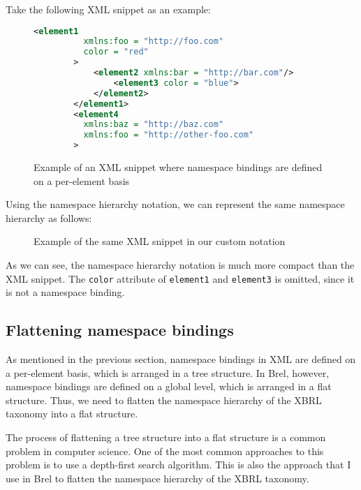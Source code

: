 Take the following XML snippet as an example:

\begin{figure}[H]
    \caption{Example of an XML snippet where namespace bindings are defined on a per-element basis}
    \label{fig:xml_namespace_notation_example}
    \begin{lstlisting}[language=XML]
        <element1 
          xmlns:foo = "http://foo.com" 
          color = "red"
        >
            <element2 xmlns:bar = "http://bar.com"/>
                <element3 color = "blue">
            </element2>
        </element1>
        <element4 
          xmlns:baz = "http://baz.com" 
          xmlns:foo = "http://other-foo.com"
        >
    \end{lstlisting}
\end{figure}

Using the namespace hierarchy notation, we can represent the same namespace hierarchy as follows:

\begin{figure}[H]
    \caption{Example of the same XML snippet in our custom notation}
    \label{fig:custom_namespace_notation_example}
\end{figure}

As we can see, the namespace hierarchy notation is much more compact than the XML snippet.
The \texttt{color} attribute of \texttt{element1} and \texttt{element3} is omitted, since it is not a namespace binding.

\subsection{Flattening namespace bindings}

As mentioned in the previous section, namespace bindings in XML are defined on a per-element basis,
which is arranged in a tree structure.
In Brel, however, namespace bindings are defined on a global level, which is arranged in a flat structure.
Thus, we need to flatten the namespace hierarchy of the XBRL taxonomy into a flat structure.

The process of flattening a tree structure into a flat structure is a common problem in computer science.
One of the most common approaches to this problem is to use a depth-first search algorithm.
This is also the approach that I use in Brel to flatten the namespace hierarchy of the XBRL taxonomy.

